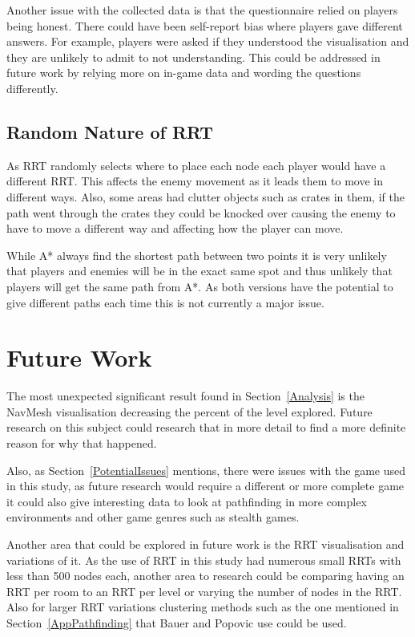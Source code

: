 \documentclass[journal]{IEEEtran}
\begin{document}
	Another issue with the collected data is that the questionnaire relied on players being honest. There could have been self-report bias where players gave different answers.  For example, players were asked if they understood the visualisation and they are unlikely to admit to not understanding. This could be addressed in future work by relying more on in-game data and wording the questions differently.
	
	\subsection{Random Nature of RRT}
	As RRT randomly selects where to place each node each player would have a different RRT. This affects the enemy movement as it leads them to move in different ways. Also, some areas had clutter objects such as crates in them, if the path went through the crates they could be knocked over causing the enemy to have to move a different way and affecting how the player can move. 
	
	While A* always find the shortest path between two points it is very unlikely that players and enemies will be in the exact same spot and thus unlikely that players will get the same path from A*. As both versions have the potential to give different paths each time this is not currently a major issue.
	
	
	\section{Future Work} \label{FutureWork}
	The most unexpected significant result found in Section~\ref{Analysis} is the NavMesh visualisation decreasing the percent of the level explored. Future research on this subject could research that in more detail to find a more definite reason for why that happened. 
	
	Also, as Section~\ref{PotentialIssues} mentions, there were issues with the game used in this study, as future research would require a different or more complete game it could also give interesting data to look at pathfinding in more complex environments and other game genres such as stealth games. 
	
	Another area that could be explored in future work is the RRT visualisation and variations of it. As the use of RRT in this study had numerous small RRTs with less than 500 nodes each, another area to research could be comparing having an RRT per room to an RRT per level or varying the number of nodes in the RRT. Also for larger RRT variations clustering methods such as the one mentioned in Section~\ref{AppPathfinding} that Bauer and Popovic use could be used.
	
\end{document}
